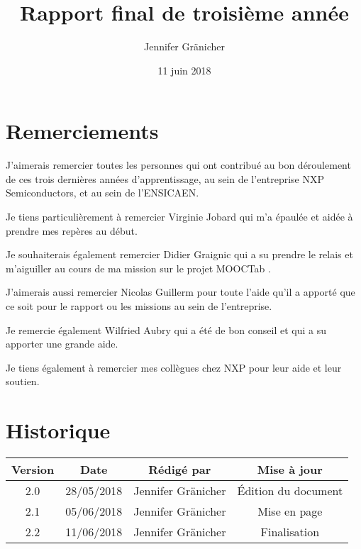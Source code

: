 \documentclass[french,12pt,a4paper,titlepage,openright,openbib]{report}
\title{Rapport final de troisième année}
\author{Jennifer Gr\"{a}nicher}
\date{11 juin 2018}
\begin{document}



\maketitle

\chapter*{Remerciements}
J'aimerais remercier toutes les personnes qui ont contribué au bon déroulement de ces trois dernières années d'apprentissage, au sein de l'entreprise NXP Semiconductors, et au sein de l'ENSICAEN.

Je tiens particulièrement à remercier Virginie Jobard qui m'a épaulée et aidée à prendre mes repères au début.

Je souhaiterais également remercier Didier Graignic qui a su prendre le relais et m'aiguiller au cours de ma mission sur le projet MOOCTab \cite{website:mooctab} \cite{website:mooctabitea}.

J'aimerais aussi remercier Nicolas Guillerm pour toute l'aide qu'il a apporté que ce soit pour le rapport ou les missions au sein de l'entreprise.

Je remercie également Wilfried Aubry qui a été de bon conseil et qui a su apporter une grande aide.

Je tiens également à remercier mes collègues chez NXP pour leur aide et leur soutien.

\tableofcontents

\chapter*{Historique}
\begin{table}[ht]
	\label{tab:historique}
	\centering
	\begin{tabular}{|c|c|c|c|}
		\hline
		{\bf Version} & {\bf Date} & {\bf Rédigé par}    & {\bf Mise à jour}    \\
		\hline
		2.0           & 28/05/2018 & Jennifer Gränicher  & Édition du document \\
		\hline
		2.1           & 05/06/2018 & Jennifer Gränicher  & Mise en page \\
		\hline
		2.2           & 11/06/2018 & Jennifer Gränicher  & Finalisation \\
		\hline
	\end{tabular}
\end{table}

\vspace{2cm}
\end{document}
